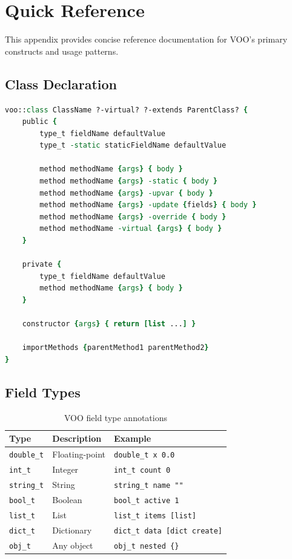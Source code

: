 \section{Quick Reference}
\label{app:quickref}

This appendix provides concise reference documentation for VOO's primary constructs and
usage patterns.

\subsection*{Class Declaration}

\begin{lstlisting}[language=Tcl, caption={VOO class declaration template}]
voo::class ClassName ?-virtual? ?-extends ParentClass? {
    public {
        type_t fieldName defaultValue
        type_t -static staticFieldName defaultValue

        method methodName {args} { body }
        method methodName {args} -static { body }
        method methodName {args} -upvar { body }
        method methodName {args} -update {fields} { body }
        method methodName {args} -override { body }
        method methodName -virtual {args} { body }
    }

    private {
        type_t fieldName defaultValue
        method methodName {args} { body }
    }

    constructor {args} { return [list ...] }

    importMethods {parentMethod1 parentMethod2}
}
\end{lstlisting}

\subsection*{Field Types}

\begin{table}[H]
\centering
\caption{VOO field type annotations}
\begin{tabular}{lll}
\toprule
\textbf{Type} & \textbf{Description} & \textbf{Example} \\
\midrule
\texttt{double\_t} & Floating-point & \texttt{double\_t x 0.0} \\
\texttt{int\_t}    & Integer        & \texttt{int\_t count 0} \\
\texttt{string\_t} & String         & \texttt{string\_t name ""} \\
\texttt{bool\_t}   & Boolean        & \texttt{bool\_t active 1} \\
\texttt{list\_t}   & List           & \texttt{list\_t items [list]} \\
\texttt{dict\_t}   & Dictionary     & \texttt{dict\_t data [dict create]} \\
\texttt{obj\_t}    & Any object     & \texttt{obj\_t nested \{\}} \\
\bottomrule
\end{tabular}
\end{table}

